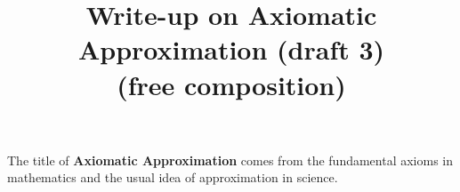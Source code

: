 \documentclass[a4paper]{article}
\title{Write-up on {\bf Axiomatic Approximation} (draft 3)\\
(free composition)}
\author{}
\date{}
\begin{document}
\maketitle

The title of \textbf{Axiomatic Approximation} comes from the fundamental axioms in mathematics and the usual idea of approximation in science.
\end{document}
